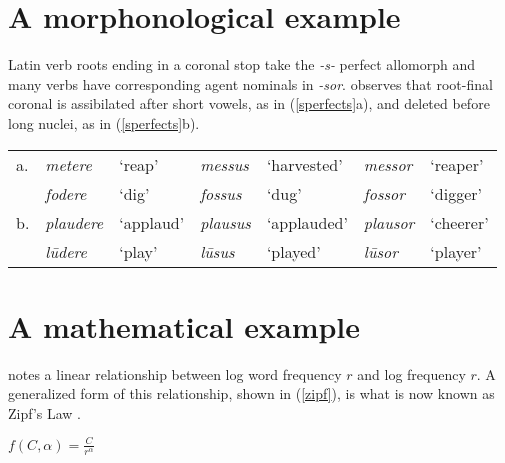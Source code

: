 \documentclass[draft,12pt]{article}
\begin{document}
\section{A morphonological example}

Latin verb roots ending in a coronal stop take the \emph{-s-} perfect allomorph and many verbs have corresponding agent nominals in \emph{-sor}. \citet{Heslin1987} observes that root-final coronal is assibilated after short vowels, as in (\ref{sperfects}a), and deleted before long nuclei, as in (\ref{sperfects}b).

\begin{example} \label{sperfects}
\begin{tabular}{l l l l l l l}
a. & \emph{metere}   & `reap'    & \emph{messus}  & `harvested' & \emph{messor}  & `reaper'   \\
   & \emph{fodere}   & `dig'     & \emph{fossus}  & `dug'       & \emph{fossor}  & `digger'   \\
b. & \emph{plaudere} & `applaud' & \emph{plausus} & `applauded' & \emph{plausor} & `cheerer'  \\
   & \emph{lūdere}   & `play'    & \emph{lūsus}   & `played'    & \emph{lūsor}   & `player' \\
\end{tabular}
\end{example}

\section{A mathematical example}

\citet{Zipf1949} notes a linear relationship between log word frequency $r$ and log frequency $r$. A generalized form of this relationship, shown in (\ref{zipf}), is what is now known as Zipf's Law \citep[e.g.,]{Baroni2009}.

\begin{unlabeledexample} \label{zipf}
$\displaystyle f(C, \alpha) = \frac{C}{r^\alpha}$
\end{unlabeledexample}



\end{document}

